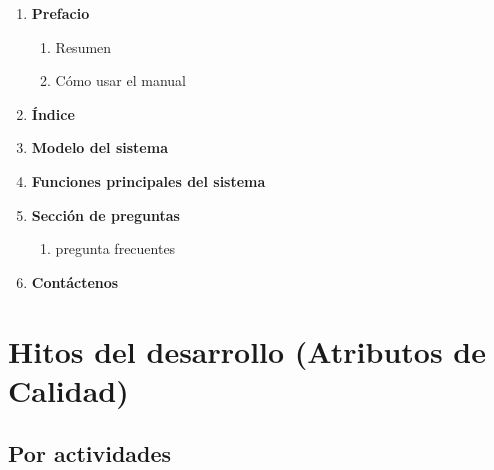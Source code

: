 \begin{framed}
     \begin{enumerate}
		\item \textbf{Prefacio}
		\begin{enumerate}
			\item Resumen
			\item Cómo usar el manual
		\end{enumerate}
		\item \textbf{Índice}
		\item \textbf{Modelo del sistema}
		\item \textbf{Funciones principales del sistema}
		\item \textbf{Sección de preguntas}
		\begin{enumerate}
			\item pregunta frecuentes 
		\end{enumerate}
		\item \textbf{Contáctenos}
	\end{enumerate}
\end{framed}

\section{Hitos del desarrollo (Atributos de Calidad)}

\subsection{Por actividades}

